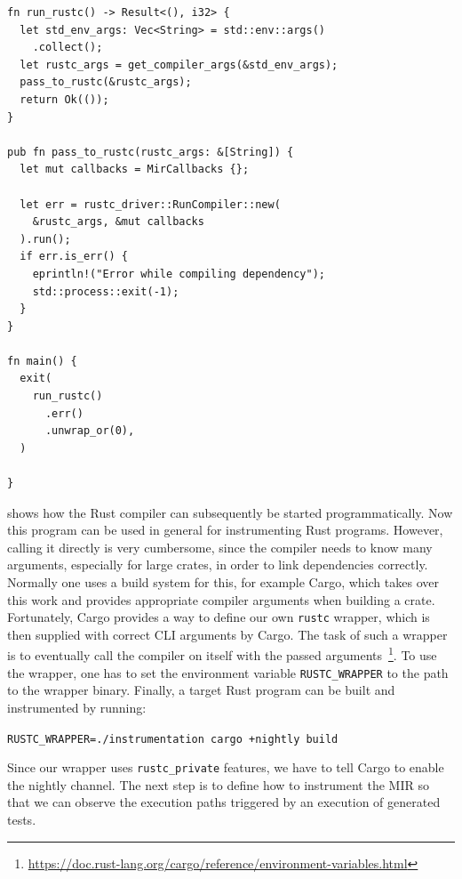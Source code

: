 \documentclass[paper=a4,%
  twoside,%
  BCOR4mm,%
  abstract=true,%
  toc=bibliography,%
  chapterprefix=true,%
  toc=bibliographynumbered,%
  open=right,%
  english,%
  pagesize=pdftex]{scrreprt}
\newcommand{\hir}{\ac{HIR}\xspace}
\newcommand{\mir}{\ac{MIR}\xspace}
\begin{document}
\begin{lstlisting}[style=boxed, caption={Running the Rust compiler like a library}, label=lst:running-compiler]
fn run_rustc() -> Result<(), i32> {
  let std_env_args: Vec<String> = std::env::args()
    .collect();
  let rustc_args = get_compiler_args(&std_env_args);
  pass_to_rustc(&rustc_args);
  return Ok(());
}

pub fn pass_to_rustc(rustc_args: &[String]) {
  let mut callbacks = MirCallbacks {};

  let err = rustc_driver::RunCompiler::new(
    &rustc_args, &mut callbacks
  ).run();
  if err.is_err() {
    eprintln!("Error while compiling dependency");
    std::process::exit(-1);
  }
}

fn main() {
  exit(
    run_rustc()
      .err()
      .unwrap_or(0),
  )

}
\end{lstlisting}

 shows how the Rust compiler can subsequently be started programmatically. Now this program can be used in general for instrumenting Rust programs. However, calling it directly is very cumbersome, since the compiler needs to know many arguments, especially for large crates, in order to link dependencies correctly. Normally one uses a build system for this, for example Cargo, which takes over this work and provides appropriate compiler arguments when building a crate. Fortunately, Cargo provides a way to define our own \texttt{rustc} wrapper, which is then supplied with correct CLI arguments by Cargo. The task of such a wrapper is to eventually call the compiler on itself with the passed arguments~\footnote{\url{https://doc.rust-lang.org/cargo/reference/environment-variables.html}}. To use the wrapper, one has to set the environment variable \texttt{RUSTC\string_WRAPPER} to the path to the wrapper binary. Finally, a target Rust program can be built and instrumented by running:

\texttt{RUSTC\string_WRAPPER=./instrumentation cargo \string+nightly build}

Since our wrapper uses \texttt{rustc\string_private} features, we have to tell Cargo to enable the nightly channel. The next step is to define how to instrument the \mir so that we can observe the execution paths triggered by an execution of generated tests.

\end{document}
